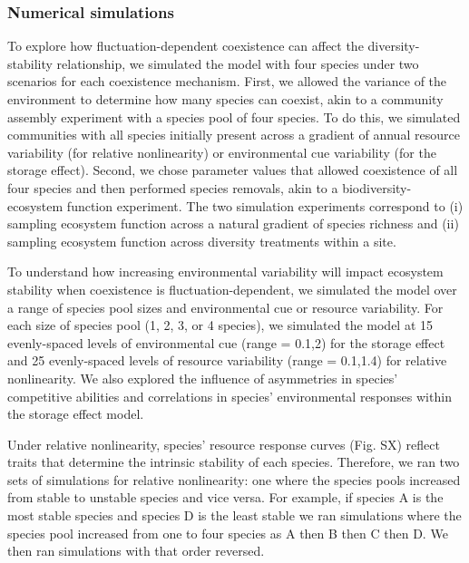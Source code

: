 \documentclass[12pt,]{article}
\begin{document}
\subsubsection{Numerical simulations}\label{numerical-simulations}

To explore how fluctuation-dependent coexistence can affect the
diversity-stability relationship, we simulated the model with four
species under two scenarios for each coexistence mechanism. First, we
allowed the variance of the environment to determine how many species
can coexist, akin to a community assembly experiment with a species pool
of four species. To do this, we simulated communities with all species
initially present across a gradient of annual resource variability (for
relative nonlinearity) or environmental cue variability (for the storage
effect). Second, we chose parameter values that allowed coexistence of
all four species and then performed species removals, akin to a
biodiversity-ecosystem function experiment. The two simulation
experiments correspond to (i) sampling ecosystem function across a
natural gradient of species richness and (ii) sampling ecosystem
function across diversity treatments within a site.

To understand how increasing environmental variability will impact
ecosystem stability when coexistence is fluctuation-dependent, we
simulated the model over a range of species pool sizes and environmental
cue or resource variability. For each size of species pool (1, 2, 3, or
4 species), we simulated the model at 15 evenly-spaced levels of
environmental cue (range = 0.1,2) for the storage effect and 25
evenly-spaced levels of resource variability (range = 0.1,1.4) for
relative nonlinearity. We also explored the influence of asymmetries in
species' competitive abilities and correlations in species'
environmental responses within the storage effect model.

Under relative nonlinearity, species' resource response curves (Fig. SX)
reflect traits that determine the intrinsic stability of each species.
Therefore, we ran two sets of simulations for relative nonlinearity: one
where the species pools increased from stable to unstable species and
vice versa. For example, if species A is the most stable species and
species D is the least stable we ran simulations where the species pool
increased from one to four species as A then B then C then D. We then
ran simulations with that order reversed.
\end{document}
